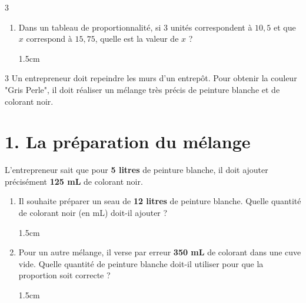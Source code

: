 \documentclass[a4paper]{book}
\begin{document}
{\begin{exerciceNote}{3}
\begin{enumerate}[leftmargin=*]
            \begin{ZoneReponse}{1.5cm}                
            \end{ZoneReponse}

            \item Dans un tableau de proportionnalité, si $3$ unités correspondent à $10,5$ et que $x$ correspond à $15,75$, quelle est la valeur de $x$ ?

            \begin{ZoneReponse}{1.5cm}                
            \end{ZoneReponse}

        \end{enumerate}
    \end{exerciceNote}


    \begin{exerciceNote}{3}
        Un entrepreneur doit repeindre les murs d'un entrepôt. Pour obtenir la couleur "Gris Perle", il doit réaliser un mélange très précis de peinture blanche et de colorant noir.

        \section*{1. La préparation du mélange}
        L'entrepreneur sait que pour \textbf{5 litres} de peinture blanche, il doit ajouter précisément \textbf{125 mL} de colorant noir.
        
        
        \begin{enumerate}[leftmargin=*]
            \item Il souhaite préparer un seau de \textbf{12 litres} de peinture blanche. Quelle quantité de colorant noir (en mL) doit-il ajouter ?

                        
            \begin{ZoneReponse}{1.5cm}                
            \end{ZoneReponse}
            
            \item Pour un autre mélange, il verse par erreur \textbf{350 mL} de colorant dans une cuve vide. Quelle quantité de peinture blanche doit-il utiliser pour que la proportion soit correcte ?

                        
            \begin{ZoneReponse}{1.5cm}                
            \end{ZoneReponse}
        \end{enumerate}
        

\end{exerciceNote}}
\end{document}
